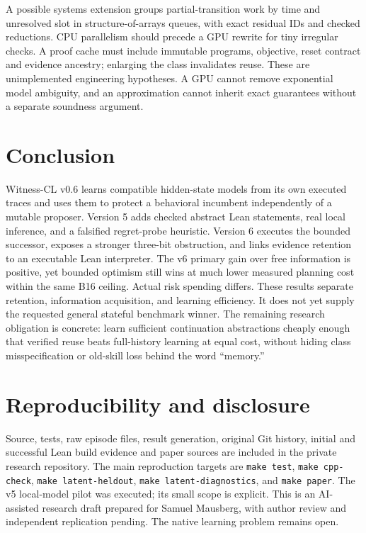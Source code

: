 \documentclass[10pt,twocolumn]{article}
\begin{document}
A possible systems extension groups partial-transition work by time and
unresolved slot in structure-of-arrays queues, with exact residual IDs and
checked reductions. CPU parallelism should precede a GPU rewrite for tiny
irregular checks. A proof cache must include immutable programs, objective,
reset contract and evidence ancestry; enlarging the class invalidates reuse.
These are unimplemented engineering hypotheses. A GPU cannot remove exponential
model ambiguity, and an approximation cannot inherit exact guarantees without
a separate soundness argument.

\section{Conclusion}
Witness-CL v0.6 learns compatible hidden-state models from its own executed traces
and uses them to protect a behavioral incumbent independently of a mutable
proposer. Version 5 adds checked abstract Lean statements, real local inference, and a
falsified regret-probe heuristic. Version 6 executes the bounded successor,
exposes a stronger three-bit obstruction, and links evidence retention to an
executable Lean interpreter. The v6 primary gain over free information is positive, yet bounded optimism
still wins at much lower measured planning cost within the same B16 ceiling.
Actual risk spending differs. These results separate retention, information
acquisition, and learning efficiency.
It does not yet supply the requested general stateful benchmark winner. The
remaining research obligation is concrete: learn sufficient continuation
abstractions cheaply enough that verified reuse beats full-history learning at
equal cost, without hiding class misspecification or old-skill loss behind the
word ``memory.''

\section*{Reproducibility and disclosure}
Source, tests, raw episode files, result generation, original Git history,
initial and successful Lean build evidence and paper sources are included in the
private research repository. The main reproduction targets are \texttt{make test},
\texttt{make cpp-check}, \texttt{make latent-heldout},
\texttt{make latent-diagnostics}, and \texttt{make paper}.
The v5 local-model pilot was executed; its small scope is explicit. This is an
AI-assisted research draft prepared for Samuel Mausberg, with author review and
independent replication pending. The native learning problem remains open.


\end{document}
